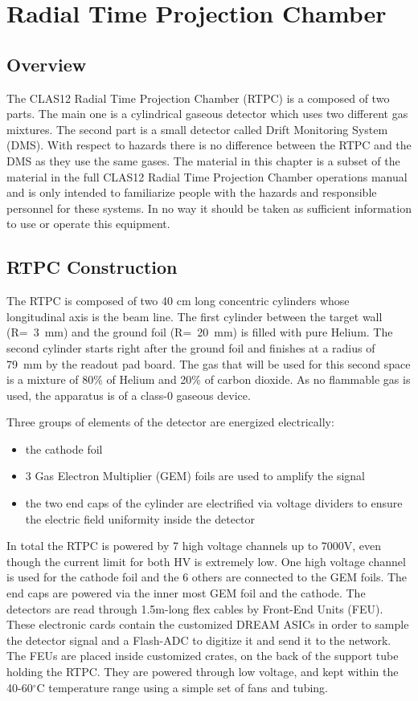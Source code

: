 \section{Radial Time Projection Chamber}

\subsection{Overview}
The CLAS12 Radial Time Projection Chamber (RTPC) is a composed of two parts. 
The main one is a cylindrical gaseous detector which uses two different gas 
mixtures.  The second part is a small detector called Drift Monitoring System 
(DMS). With respect to hazards there is no difference between the RTPC and the 
DMS as they use the same gases. The material in this chapter is a subset of the 
material in the full CLAS12 Radial Time Projection Chamber operations manual 
and is only intended to familiarize people with the hazards and responsible 
personnel for these systems. In no way it should be taken as sufficient 
information to use or operate this equipment.

\subsection{RTPC Construction}
The RTPC is composed of two 40 cm long concentric cylinders whose longitudinal 
axis is the beam line. The first cylinder between the target wall (R=~3~mm) and 
the ground foil (R=~20~mm) is filled with pure Helium. The second cylinder 
starts right after the ground foil and finishes at a radius of 79~mm by the 
readout pad board. The gas that will be used for this second space is a mixture 
of 80\% of Helium and 20\% of carbon dioxide. As no flammable gas is used, the 
apparatus is of a class-0 gaseous device. 

Three groups of elements of the detector are energized electrically:
\begin{itemize}
\item the cathode foil
\item 3 Gas Electron Multiplier (GEM) foils are used to amplify the signal
\item the two end caps of the cylinder are electrified via voltage dividers to 
   ensure the electric field uniformity inside the detector
\end{itemize}

In total the RTPC is powered by 7 high voltage channels up to 7000V, even 
though the current limit for both HV is extremely low. One high voltage channel 
is used for the cathode foil and the 6 others are connected to the GEM foils.  
The end caps are powered via the inner most GEM foil and the cathode. The 
detectors are read through 1.5m-long flex cables by Front-End Units (FEU).  
These electronic cards contain the customized DREAM ASICs in order to sample 
the detector signal and a Flash-ADC to digitize it and send it to the network.  
The FEUs are placed inside customized crates, on the back of the support tube 
holding the RTPC. They are powered through low voltage, and kept within the 
40-60$^\circ$C temperature range using a simple set of fans and tubing.

